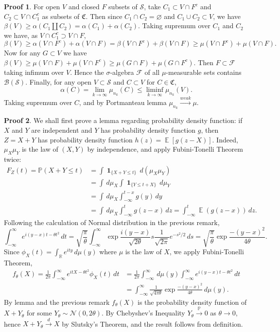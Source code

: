\documentclass[hidelinks,11pt]{article}
\theoremstyle{definition}
\theoremstyle{dotless}
\newtheorem{prop}{Proof}[section]
\theoremstyle{remark}
\DeclareMathOperator{\E}{\mathbb{E}}
\DeclareMathOperator{\1}{\mathbf{1}}
\DeclareMathOperator{\0}{\mathbf{0}}
\begin{document}
\begin{prop}
For open $V$ and closed $F$ subsets of $\mathcal{S}$, take $C_1\subset V\cap F^c$ and $C_2\subset V\cap C_1^c$ as subsets of $\mathfrak{C}$. Then since $C_1\cap C_2=\varnothing$ and $C_1\cup C_2\subset V$, we have $\beta(V)\geq\alpha(C_1\amalg C_2)=\alpha(C_1)+\alpha(C_2)$.
Taking supremum over $C_1$ and $C_2$ we have, as $V\cap C_1^c\supset V\cap F$,
\[\beta(V)\geq\alpha(V\cap F^c)+\alpha(V\cap F)=\beta(V\cap F^c)+\beta(V\cap F)\geq\mu(V\cap F^c)+\mu(V\cap F).\]\medbreak
Now for any $G\subset V$ we have $\beta(V)\geq\mu(V\cap F)+\mu(V\cap F^c)\geq\mu(G\cap F)+\mu(G\cap F^c)$.
Then $F\subset\mathcal{F}$ taking infimum over $V$. Hence the $\sigma$-algebra $\mathcal{F}$ of all $\mu$-measurable sets contains $\mathcal{B}(\mathcal{S})$.\medbreak
Finally, for any open $V\subset\mathcal{S}$ and $C\subset V$ for $C\in\mathfrak{C}$,
\[\alpha(C)=\lim_{k\to\infty}\mu_{n_k}(C)\leq\liminf_{k\to\infty}\mu_{n_k}(V).\]
Taking supremum over $C$, and by Portmanteau lemma $\mu_{n_k}\xrightarrow{weak}\mu$.
\end{prop}

\begin{prop}
We shall first prove a lemma regarding probability density function: if $X$ and $Y$ are independent and $Y$ has probability density function $g$, then $Z=X+Y$ has probability density function $h(z)=\E[g(z-X)]$.\medbreak
Indeed, $\mu_X\mu_Y$ is the law of $(X,Y)$ by independence, and apply Fubini-Tonelli Theorem twice:
\begin{align*}
F_Z(t)=\mathbb{P}(X+Y\leq t)&=\int\1_{\{X+Y\leq t\}}\,d(\mu_X\mu_Y)\\
&=\int\,d\mu_X\int\1_{\{Y\leq t+X\}}\,d\mu_Y\\
&=\int\,d\mu_X\int_{-\infty}^{t-x}g(y)\,dy\\
&=\int\,d\mu_X\int_{-\infty}^tg(z-x)\,dz=\int_{-\infty}^t\E(g(z-x))\,dz.
\end{align*}
Following the calculation of Normal distribution in the previous remark,
\[\int_{-\infty}^\infty e^{i(y-x)t-\theta t^2}\,dt=\sqrt{\frac{\pi}{\theta}}\int_{-\infty}^\infty\exp{\frac{i(y-x)}{\sqrt{2\theta}}s}\frac{1}{\sqrt{2\pi}}e^{-s^2/2}\,ds=\sqrt{\frac{\pi}{\theta}}\exp{\frac{-(y-x)^2}{4\theta}}.\]
Since $\phi_X(t)=\int_\mathbb{R}e^{ity}\,d\mu(y)$ where $\mu$ is the law of $X$, we apply Fubini-Tonelli Theorem,
\begin{align*}
f_\theta(X)=\frac{1}{2\pi}\int_{-\infty}^\infty e^{itX-\theta t^2}\phi_X(t)\,dt&=\frac{1}{2\pi}\int_{-\infty}^\infty\,d\mu(y)\int_{-\infty}^\infty e^{i(y-x)t-\theta t^2}\,dt\\&=\int_{-\infty}^\infty\frac{1}{\sqrt{4\pi\theta}}\exp{\frac{-(y-x)^2}{4\theta}}\,d\mu(y).
\end{align*}
By lemma and the previous remark $f_\theta(X)$ is the probability density function of $X+Y_\theta$ for some $Y_\theta\sim \mathcal{N}(0,2\theta)$. By Chebyshev's Inequality $Y_\theta\xrightarrow{\mathbb{P}}0$ as $\theta\to0$, hence $X+Y_\theta\xrightarrow{d}X$ by Slutsky's Theorem, and the result follows from definition.
\end{prop}
\end{document}
